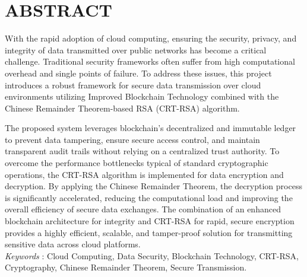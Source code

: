 \clearpage
{}
{}
\chapter*{ABSTRACT}
With the rapid adoption of cloud computing, ensuring the security, privacy, and integrity of data transmitted over public networks has become a critical challenge. Traditional security frameworks often suffer from high computational overhead and single points of failure. To address these issues, this project introduces a robust framework for secure data transmission over cloud environments utilizing Improved Blockchain Technology combined with the Chinese Remainder Theorem-based RSA (CRT-RSA) algorithm. 

The proposed system leverages blockchain's decentralized and immutable ledger to prevent data tampering, ensure secure access control, and maintain transparent audit trails without relying on a centralized trust authority. To overcome the performance bottlenecks typical of standard cryptographic operations, the CRT-RSA algorithm is implemented for data encryption and decryption. By applying the Chinese Remainder Theorem, the decryption process is significantly accelerated, reducing the computational load and improving the overall efficiency of secure data exchanges. The combination of an enhanced blockchain architecture for integrity and CRT-RSA for rapid, secure encryption provides a highly efficient, scalable, and tamper-proof solution for transmitting sensitive data across cloud platforms.
\\

\textit{Keywords} : Cloud Computing, Data Security, Blockchain Technology, CRT-RSA, Cryptography, Chinese Remainder Theorem, Secure Transmission.
